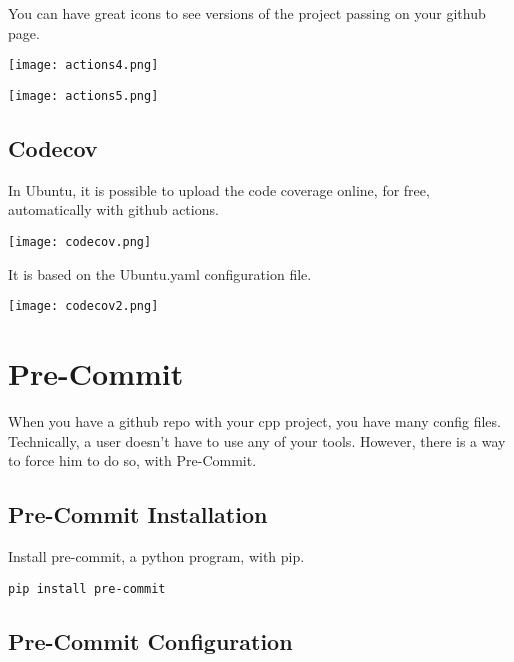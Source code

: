 You can have great icons to see versions of the project passing on your github page.


\begin{center}
    \texttt{[image: actions4.png]}
\end{center}


\begin{center}
    \texttt{[image: actions5.png]}
\end{center}


\subsection{Codecov}

In Ubuntu, it is possible to upload the code coverage online, for free, automatically with github actions.

\begin{center}
    \texttt{[image: codecov.png]}
\end{center}

It is based on the Ubuntu.yaml configuration file.

\begin{center}
    \texttt{[image: codecov2.png]}
\end{center}



\section{Pre-Commit}

When you have a github repo with your cpp project, you have many config files. Technically,
a user doesn't have to use any of your tools. However, there is a way to force him to do so, with 
Pre-Commit.


\subsection{Pre-Commit Installation}

Install pre-commit, a python program, with pip.

\begin{verbatim}
pip install pre-commit
\end{verbatim}


\subsection{Pre-Commit Configuration}

